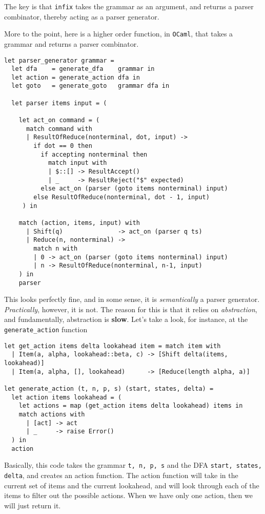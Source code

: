 The key is that \texttt{infix} takes the grammar as an argument, and returns a parser combinator, thereby acting as a parser generator. 

More to the point, here is a higher order function, in \texttt{OCaml}, that takes a grammar and returns a parser combinator.

\begin{verbatim}
let parser_generator grammar =
  let dfa    = generate_dfa    grammar in
  let action = generate_action dfa in
  let goto   = generate_goto   grammar dfa in

  let parser items input = (

    let act_on command = (
      match command with
      | ResultOfReduce(nonterminal, dot, input) -> 
        if dot == 0 then
          if accepting nonterminal then 
            match input with
            | $::[] -> ResultAccept()
            | _     -> ResultReject("$" expected)
          else act_on (parser (goto items nonterminal) input)
        else ResultOfReduce(nonterminal, dot - 1, input)
     ) in 
    
    match (action, items, input) with
      | Shift(q)               -> act_on (parser q ts) 
      | Reduce(n, nonterminal) -> 
        match n with 
        | 0 -> act_on (parser (goto items nonterminal) input)
        | n -> ResultOfReduce(nonterminal, n-1, input)
    ) in 
    parser
\end{verbatim}
This looks perfectly fine, and in some sense, it is \textit{semantically} a parser generator. \textit{Practically}, however, it is not. The reason for this is that it relies on \textit{abstraction}, and fundamentally, abstraction is \textbf{slow}. Let's take a look, for instance, at the \texttt{generate\_action} function

\begin{verbatim}
let get_action items delta lookahead item = match item with
  | Item(a, alpha, lookahead::beta, c) -> [Shift delta(items, lookahead)]
  | Item(a, alpha, [], lookahead)      -> [Reduce(length alpha, a)]
  
let generate_action (t, n, p, s) (start, states, delta) =
  let action items lookahead = (
    let actions = map (get_action items delta lookahead) items in
    match actions with
      | [act] -> act
      | _     -> raise Error()
  ) in
  action
\end{verbatim}
Basically, this code takes the grammar \texttt{t, n, p, s} and the DFA \texttt{start, states, delta}, and creates an action function. The action function will take in the current set of items and the current lookahead, and will look through each of the items to filter out the possible actions. When we have only one action, then we will just return it. 

